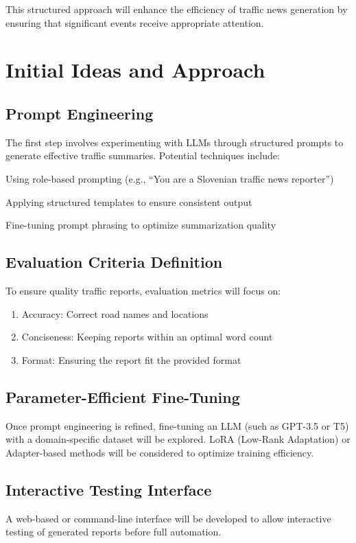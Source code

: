 \documentclass[fleqn,moreauthors,10pt]{ds_report}
\begin{document}
This structured approach will enhance the efficiency of traffic news generation by ensuring that significant events receive appropriate attention.

\section*{Initial Ideas and Approach}

\subsection*{Prompt Engineering}

The first step involves experimenting with LLMs through structured prompts to generate effective traffic summaries. Potential techniques include:

Using role-based prompting (e.g., “You are a Slovenian traffic news reporter”)

Applying structured templates to ensure consistent output

Fine-tuning prompt phrasing to optimize summarization quality

\subsection*{Evaluation Criteria Definition}

To ensure quality traffic reports, evaluation metrics will focus on:

\begin{enumerate}[noitemsep] 
	\item Accuracy: Correct road names and locations
    
	\item Conciseness: Keeping reports within an optimal word count

        \item Format: Ensuring the report fit the provided format
\end{enumerate}


\subsection*{Parameter-Efficient Fine-Tuning}

Once prompt engineering is refined, fine-tuning an LLM (such as GPT-3.5 or T5) with a domain-specific dataset will be explored. LoRA (Low-Rank Adaptation) or Adapter-based methods will be considered to optimize training efficiency.

\subsection*{Interactive Testing Interface}

A web-based or command-line interface will be developed to allow interactive testing of generated reports before full automation.




\end{document}
